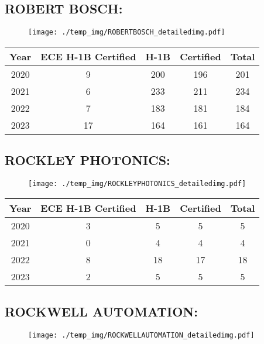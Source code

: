\documentclass{article}%
\begin{document}
%
\newpage%
\subsection{ROBERT BOSCH:}%
\label{subsec:ROBERTBOSCH}%
\label{ROBERTBOSCHdetailed}%


\begin{figure}[htbp]%
\centering%
\texttt{[image: ./temp\_img/ROBERTBOSCH\_detailedimg.pdf]}%
\end{figure}

%
\begin{longtable}{c|c|c|c|c}%
\hline%
Year&ECE H{-}1B Certified&H{-}1B&Certified&Total\\%
\hline%
2020&9&200&196&201\\%
\hline%
2021&6&233&211&234\\%
\hline%
2022&7&183&181&184\\%
\hline%
2023&17&164&161&164\\%
\hline%
\end{longtable}

%
\newpage%
\subsection{ROCKLEY PHOTONICS:}%
\label{subsec:ROCKLEYPHOTONICS}%
\label{ROCKLEYPHOTONICSdetailed}%


\begin{figure}[htbp]%
\centering%
\texttt{[image: ./temp\_img/ROCKLEYPHOTONICS\_detailedimg.pdf]}%
\end{figure}

%
\begin{longtable}{c|c|c|c|c}%
\hline%
Year&ECE H{-}1B Certified&H{-}1B&Certified&Total\\%
\hline%
2020&3&5&5&5\\%
\hline%
2021&0&4&4&4\\%
\hline%
2022&8&18&17&18\\%
\hline%
2023&2&5&5&5\\%
\hline%
\end{longtable}

%
\newpage%
\subsection{ROCKWELL AUTOMATION:}%
\label{subsec:ROCKWELLAUTOMATION}%
\label{ROCKWELLAUTOMATIONdetailed}%


\begin{figure}[htbp]%
\centering%
\texttt{[image: ./temp\_img/ROCKWELLAUTOMATION\_detailedimg.pdf]}%
\end{figure}
\end{document}
